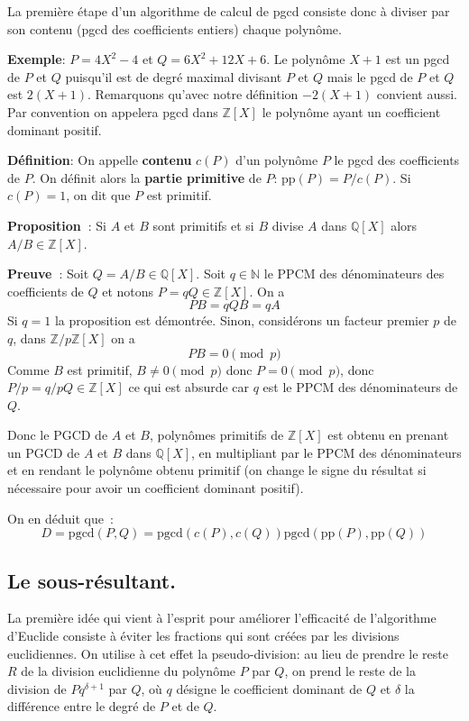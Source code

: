 \documentclass[a4paper,11pt]{article}
\newcommand{\Z}{{\mathbb{Z}}}
\newcommand{\N}{{\mathbb{N}}}
\newcommand{\Q}{{\mathbb{Q}}}
\begin{document}
La première étape d'un algorithme de calcul de pgcd consiste donc
à diviser par son contenu (pgcd des coefficients entiers) chaque polynôme.

{\bf{Exemple}}: $P = 4 X^2 - 4$ et $Q = 6 X^2 + 12 X + 6$. Le polynôme
$X + 1$ est un pgcd de $P$ et $Q$ puisqu'il est de degré maximal divisant $P$
et $Q$ mais le pgcd de $P$ et $Q$ est $2 ( X + 1 )$. Remarquons qu'avec notre
définition $- 2 ( X + 1 )$ convient aussi. Par convention on appelera
pgcd dans $\Z[X]$ le
polynôme ayant un coefficient dominant positif.

{\bf{Définition}}: On appelle {\bf contenu} $c ( P )$ d'un polynôme $P$ le
pgcd des coefficients de $P$. On définit alors la 
{\bf partie primitive} de $P$:
pp$( P ) = P / c ( P )$. Si $c(P)=1$, on dit que $P$ est primitif.

{\bf Proposition~}: Si $A$ et $B$ sont primitifs et si $B$ divise $A$
dans $\Q[X]$ alors $A/B \in \Z[X]$.

{\bf Preuve~}: Soit $Q=A/B \in \Q[X]$. Soit $q \in \N $ le PPCM des
d\'enominateurs des coefficients de $Q$ et notons $P=qQ \in \Z[X]$. On a
$$ P B = qQB=q A $$
Si $q=1$ la proposition est d\'emontr\'ee. 
Sinon, consid\'erons un facteur premier $p$ de $q$, dans $\Z/p\Z[X]$ on a
$$ PB = 0 \pmod p$$
Comme $B$ est primitif, $B\neq 0 \pmod p$ donc
$P=0 \pmod p$, donc $P/p=q/p Q \in \Z[X]$ ce qui est absurde car $q$
est le PPCM des d\'enominateurs de $Q$.

Donc le PGCD de $A$ et $B$, polyn\^omes primitifs de $\Z[X]$ est
obtenu en prenant un PGCD de $A$ et $B$ dans $\Q[X]$, en multipliant
par le PPCM des d\'enominateurs et en rendant le polyn\^ome obtenu
primitif (on change le signe du r\'esultat si n\'ecessaire pour avoir
un coefficient dominant positif).

On en d\'eduit que~:
\[ D = \mbox{pgcd} ( P, Q ) = \mbox{pgcd} ( c ( P ), c ( Q )) \mbox{pgcd} (
   \mbox{pp} ( P ), \mbox{pp} ( Q )) \]


\subsection{Le sous-résultant.}

La première idée qui vient à l'esprit pour améliorer l'efficacité de
l'algorithme d'Euclide consiste à éviter les fractions qui sont créées par les
divisions euclidiennes. On utilise à cet effet la pseudo-division: au lieu de
prendre le reste $R$ de la division euclidienne du polynôme $P$ par $Q$, on
prend le reste de la division de $P q^{\delta + 1}$ par $Q$, où $q$ désigne le
coefficient dominant de $Q$ et $\delta$ la différence entre le degré de $P$ et
de $Q$.
\end{document}
